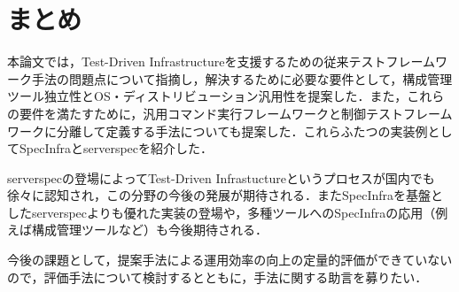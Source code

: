 \section{まとめ}

本論文では，Test-Driven Infrastructureを支援するための従来テストフレームワーク手法の問題点について指摘し，解決するために必要な要件として，構成管理ツール独立性とOS・ディストリビューション汎用性を提案した．また，これらの要件を満たすために，汎用コマンド実行フレームワークと制御テストフレームワークに分離して定義する手法についても提案した．これらふたつの実装例としてSpecInfraとserverspecを紹介した．

serverspecの登場によってTest-Driven Infrastuctureというプロセスが国内でも徐々に認知され，この分野の今後の発展が期待される．またSpecInfraを基盤としたserverspecよりも優れた実装の登場や，多種ツールへのSpecInfraの応用（例えば構成管理ツールなど）も今後期待される．

今後の課題として，提案手法による運用効率の向上の定量的評価ができていないので，評価手法について検討するとともに，手法に関する助言を募りたい．


